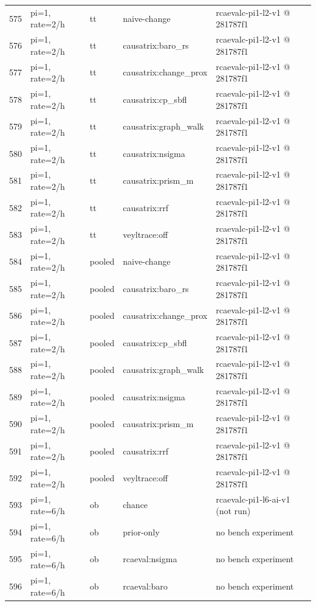 \begin{longtable}{@{}r>{\raggedright\arraybackslash}p{48.0pt}>{\raggedright\arraybackslash}p{18.0pt}>{\raggedright\arraybackslash}p{108.0pt}>{\raggedright\arraybackslash}p{105.0pt}@{}}
575 & pi=1, rate=2/h & tt & naive-change & rcaevalc-pi1-l2-v1 @ 281787f1 \\
576 & pi=1, rate=2/h & tt & causatrix:baro\_rs & rcaevalc-pi1-l2-v1 @ 281787f1 \\
577 & pi=1, rate=2/h & tt & causatrix:change\_prox & rcaevalc-pi1-l2-v1 @ 281787f1 \\
578 & pi=1, rate=2/h & tt & causatrix:cp\_sbfl & rcaevalc-pi1-l2-v1 @ 281787f1 \\
579 & pi=1, rate=2/h & tt & causatrix:graph\_walk & rcaevalc-pi1-l2-v1 @ 281787f1 \\
580 & pi=1, rate=2/h & tt & causatrix:nsigma & rcaevalc-pi1-l2-v1 @ 281787f1 \\
581 & pi=1, rate=2/h & tt & causatrix:prism\_m & rcaevalc-pi1-l2-v1 @ 281787f1 \\
582 & pi=1, rate=2/h & tt & causatrix:rrf & rcaevalc-pi1-l2-v1 @ 281787f1 \\
583 & pi=1, rate=2/h & tt & veyltrace:off & rcaevalc-pi1-l2-v1 @ 281787f1 \\
584 & pi=1, rate=2/h & pooled & naive-change & rcaevalc-pi1-l2-v1 @ 281787f1 \\
585 & pi=1, rate=2/h & pooled & causatrix:baro\_rs & rcaevalc-pi1-l2-v1 @ 281787f1 \\
586 & pi=1, rate=2/h & pooled & causatrix:change\_prox & rcaevalc-pi1-l2-v1 @ 281787f1 \\
587 & pi=1, rate=2/h & pooled & causatrix:cp\_sbfl & rcaevalc-pi1-l2-v1 @ 281787f1 \\
588 & pi=1, rate=2/h & pooled & causatrix:graph\_walk & rcaevalc-pi1-l2-v1 @ 281787f1 \\
589 & pi=1, rate=2/h & pooled & causatrix:nsigma & rcaevalc-pi1-l2-v1 @ 281787f1 \\
590 & pi=1, rate=2/h & pooled & causatrix:prism\_m & rcaevalc-pi1-l2-v1 @ 281787f1 \\
591 & pi=1, rate=2/h & pooled & causatrix:rrf & rcaevalc-pi1-l2-v1 @ 281787f1 \\
592 & pi=1, rate=2/h & pooled & veyltrace:off & rcaevalc-pi1-l2-v1 @ 281787f1 \\
593 & pi=1, rate=6/h & ob & chance & rcaevalc-pi1-l6-ai-v1 (not run) \\
594 & pi=1, rate=6/h & ob & prior-only & no bench experiment \\
595 & pi=1, rate=6/h & ob & rcaeval:nsigma & no bench experiment \\
596 & pi=1, rate=6/h & ob & rcaeval:baro & no bench experiment \\

\end{longtable}
